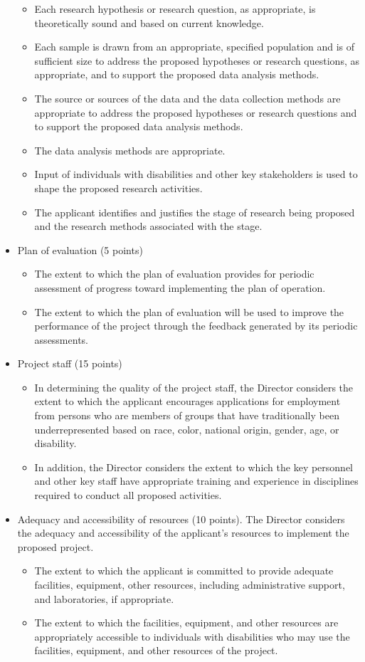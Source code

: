 \begin{itemize}
\begin{itemize}
    \item Each research hypothesis or research question, as appropriate, is theoretically sound and based on current knowledge.
    \item Each sample is drawn from an appropriate, specified population and is of sufficient size to address the proposed hypotheses or research questions, as appropriate, and to support the proposed data analysis methods.
    \item The source or sources of the data and the data collection methods are appropriate to address the proposed hypotheses or research questions and to support the proposed data analysis methods.
    \item The data analysis methods are appropriate.
    \item Input of individuals with disabilities and other key stakeholders is used to shape the proposed research activities.
    \item The applicant identifies and justifies the stage of research being proposed and the research methods associated with the stage.
\end{itemize}
    \item Plan of evaluation (5 points)
    \begin{itemize}
\item The extent to which the plan of evaluation provides for periodic assessment of progress toward implementing the plan of operation.
\item The extent to which the plan of evaluation will be used to improve the performance of the project through the feedback generated by its periodic assessments.
    \end{itemize}
    \item Project staff (15 points)
    \begin{itemize}
\item In determining the quality of the project staff, the Director considers the extent to which the applicant encourages applications for employment from persons who are members of groups that have traditionally been underrepresented based on race, color, national origin, gender, age, or disability.
\item In addition, the Director considers the extent to which the key personnel and other key staff
have appropriate training and experience in disciplines required to conduct all proposed activities.
    \end{itemize}
    \item Adequacy and accessibility of resources (10 points). The Director considers the adequacy and accessibility of the applicant's resources to implement the proposed project.
    \begin{itemize}
\item The extent to which the applicant is committed to provide adequate facilities, equipment, other resources, including administrative support, and laboratories, if appropriate.
\item The extent to which the facilities, equipment, and other resources are appropriately accessible to individuals with disabilities who may use the facilities, equipment, and other resources of the project.


\end{itemize}
\end{itemize}
